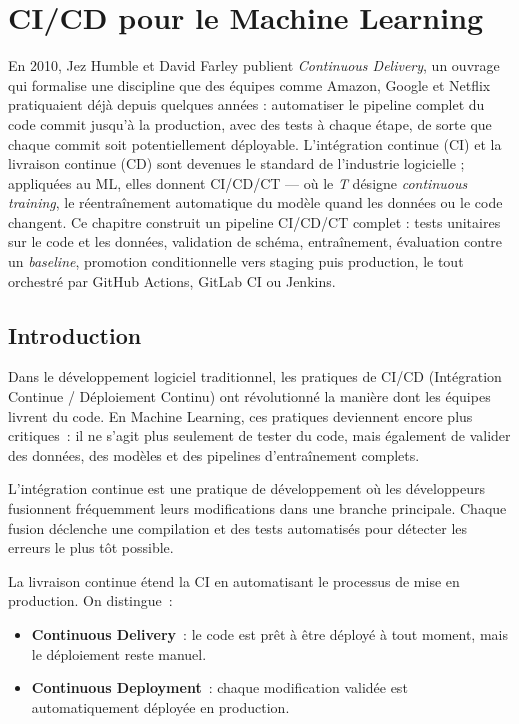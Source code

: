 \chapter{CI/CD pour le Machine Learning}
\label{ch:cicd}

En 2010, Jez Humble et David Farley publient \emph{Continuous Delivery}, un ouvrage qui formalise une discipline que des équipes comme Amazon, Google et Netflix pratiquaient déjà depuis quelques années : automatiser le pipeline complet du code commit jusqu'à la production, avec des tests à chaque étape, de sorte que chaque commit soit potentiellement déployable. L'intégration continue (CI) et la livraison continue (CD) sont devenues le standard de l'industrie logicielle ; appliquées au ML, elles donnent CI/CD/CT --- où le \emph{T} désigne \emph{continuous training}, le réentraînement automatique du modèle quand les données ou le code changent. Ce chapitre construit un pipeline CI/CD/CT complet : tests unitaires sur le code et les données, validation de schéma, entraînement, évaluation contre un \emph{baseline}, promotion conditionnelle vers staging puis production, le tout orchestré par GitHub Actions, GitLab CI ou Jenkins.

\section{Introduction}

Dans le d\'eveloppement logiciel traditionnel, les pratiques de CI/CD (Int\'egration Continue / D\'eploiement Continu) ont r\'evolutionn\'e la mani\`ere dont les \'equipes livrent du code. En Machine Learning, ces pratiques deviennent encore plus critiques~: il ne s'agit plus seulement de tester du code, mais \'egalement de valider des donn\'ees, des mod\`eles et des pipelines d'entra\^inement complets.

\begin{definition}
L'int\'egration continue est une pratique de d\'eveloppement o\`u les d\'eveloppeurs fusionnent fr\'equemment leurs modifications dans une branche principale. Chaque fusion d\'eclenche une compilation et des tests automatis\'es pour d\'etecter les erreurs le plus t\^ot possible.
\end{definition}

\begin{definition}
La livraison continue \'etend la CI en automatisant le processus de mise en production. On distingue~:
\begin{itemize}
    \item \textbf{Continuous Delivery}~: le code est pr\^et \`a \^etre d\'eploy\'e \`a tout moment, mais le d\'eploiement reste manuel.
    \item \textbf{Continuous Deployment}~: chaque modification valid\'ee est automatiquement d\'eploy\'ee en production.
\end{itemize}
\end{definition}


